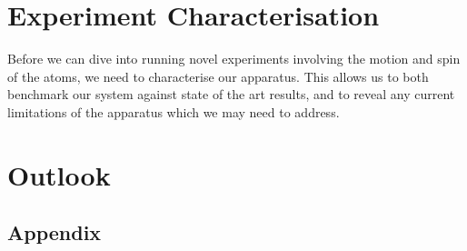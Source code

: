 \documentclass[12pt]{report}
\begin{document}
\chapter{Experiment Characterisation}

Before we can dive into running novel experiments involving the motion and spin
of the atoms, we need to characterise our apparatus. This allows us to both
benchmark our system against state of the art results, and to reveal any
current limitations of the apparatus which we may need to address.


\chapter{Outlook}



\clearpage


\clearpage
\section{Appendix}
\end{document}
